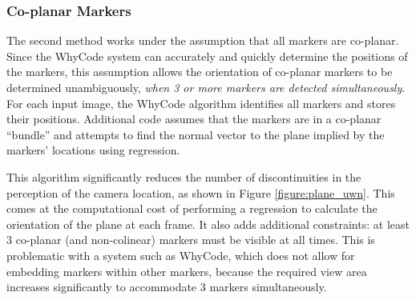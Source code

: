 \subsubsection{Co-planar Markers}

The second method works under the assumption that all markers are co-planar.
Since the WhyCode system can accurately and quickly determine the positions of the markers,
this assumption allows the orientation of co-planar markers to be determined unambiguously,
\textit{when 3 or more markers are detected simultaneously}.
For each input image, the WhyCode algorithm identifies all markers and stores their positions.
Additional code assumes that the markers are in a co-planar ``bundle'' and attempts to find the normal vector to the
plane implied by the markers' locations using regression.

This algorithm significantly reduces the number of discontinuities in the perception of the camera location,
as shown in Figure \ref{figure:plane_uwn}.
This comes at the computational cost of performing a regression to calculate the orientation of the plane at each frame.
It also adds additional constraints: at least 3 co-planar (and non-colinear) markers must be visible at all times.
This is problematic with a system such as WhyCode, which does not allow for embedding markers within other markers,
because the required view area increases significantly to accommodate 3 markers simultaneously.


